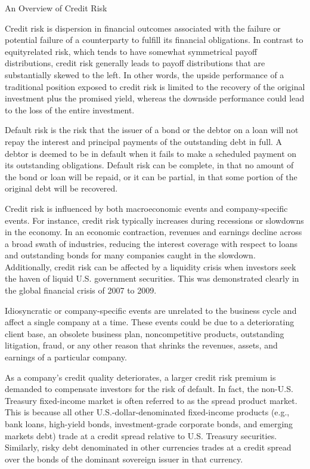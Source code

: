 \documentclass[11pt]{article}
\begin{document}
An Overview of Credit Risk

Credit risk is dispersion in financial outcomes associated with the failure or potential failure of a counterparty to fulfill its financial obligations. In contrast to equityrelated risk, which tends to have somewhat symmetrical payoff distributions, credit risk generally leads to payoff distributions that are substantially skewed to the left. In other words, the upside performance of a traditional position exposed to credit risk is limited to the recovery of the original investment plus the promised yield, whereas the downside performance could lead to the loss of the entire investment.

Default risk is the risk that the issuer of a bond or the debtor on a loan will not repay the interest and principal payments of the outstanding debt in full. A debtor is deemed to be in default when it fails to make a scheduled payment on its outstanding obligations. Default risk can be complete, in that no amount of the bond or loan will be repaid, or it can be partial, in that some portion of the original debt will be recovered.

Credit risk is influenced by both macroeconomic events and company-specific events. For instance, credit risk typically increases during recessions or slowdowns in the economy. In an economic contraction, revenues and earnings decline across a broad swath of industries, reducing the interest coverage with respect to loans and outstanding bonds for many companies caught in the slowdown. Additionally, credit risk can be affected by a liquidity crisis when investors seek the haven of liquid U.S. government securities. This was demonstrated clearly in the global financial crisis of 2007 to 2009.

Idiosyncratic or company-specific events are unrelated to the business cycle and affect a single company at a time. These events could be due to a deteriorating client base, an obsolete business plan, noncompetitive products, outstanding litigation, fraud, or any other reason that shrinks the revenues, assets, and earnings of a particular company.

As a company's credit quality deteriorates, a larger credit risk premium is demanded to compensate investors for the risk of default. In fact, the non-U.S. Treasury fixed-income market is often referred to as the spread product market. This is because all other U.S.-dollar-denominated fixed-income products (e.g., bank loans, high-yield bonds, investment-grade corporate bonds, and emerging markets debt) trade at a credit spread relative to U.S. Treasury securities. Similarly, risky debt denominated in other currencies trades at a credit spread over the bonds of the dominant sovereign issuer in that currency.
\end{document}
